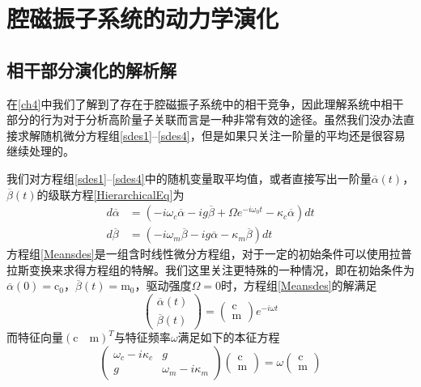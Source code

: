 
\chapter{腔磁振子系统的动力学演化}
\label{ch5}

\section{相干部分演化的解析解}
在\ref{ch4}中我们了解到了存在于腔磁振子系统中的相干竞争，因此理解系统中相干部分的行为对于分析高阶量子关联而言是一种非常有效的途径。虽然我们没办法直接求解随机微分方程组\eqref{sdes1}--\eqref{sdes4}，但是如果只关注一阶量的平均还是很容易继续处理的。

我们对方程组\eqref{sdes1}--\eqref{sdes4}中的随机变量取平均值，或者直接写出一阶量$\overline{\alpha}(t)$，$\overline{\beta}(t)$的级联方程\ref{HierarchicalEq}为
\begin{equation}
\begin{aligned}
d{\overline{\alpha}}&=(-i\omega_{c}\overline{\alpha}-ig\overline{\beta}+\Omega e^{-i\omega_{0}t}-\kappa_{c}\overline{\alpha})dt \\
d{\overline{\beta}}&=(-i\omega_{m}\overline{\beta}-ig\overline{\alpha}-\kappa_{m}\overline{\beta})dt 
\end{aligned}\label{Meansdes}
\end{equation}
方程组\eqref{Meansdes}是一组含时线性微分方程组，对于一定的初始条件可以使用拉普拉斯变换来求得方程组的特解。我们这里关注更特殊的一种情况，即在初始条件为$\overline{\alpha}(0)=\mathrm{c}_0$，$\overline{\beta}(t)=\mathrm{m}_0$，驱动强度$\Omega=0$时，方程组\eqref{Meansdes}的解满足
\begin{equation}
\left(\begin{array}{c}
\overline{\alpha}(t) \\
\overline{\beta}(t)
\end{array}\right)=\left(\begin{array}{c}
\mathrm{c} \\
\mathrm{m}
\end{array}\right) e^{-i \omega t}
\label{FormalSolution}
\end{equation}
而特征向量$(\mathrm{c} \quad \mathrm{m})^T$与特征频率$\omega$满足如下的本征方程
\begin{equation}
\left(\begin{array}{cc}
\omega_{c}-i \kappa_{c} & g \\
g & \omega_{m}-i \kappa_{m}
\end{array}\right)\left(\begin{array}{c}
\mathrm{c} \\
\mathrm{m}
\end{array}\right)=\omega\left(\begin{array}{l}
\mathrm{c} \\
\mathrm{m}
\end{array}\right)
\end{equation}
